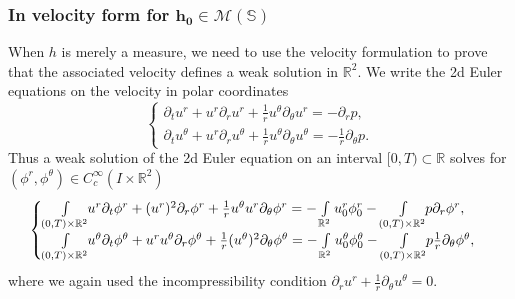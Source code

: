 \documentclass[10pt]{amsart}
\theoremstyle{plain}
\theoremstyle{definition}
\newcommand{\bbR}{\mathbb R}
\begin{document}
\subsubsection{In velocity form for $\boldsymbol{h_0\in \mathcal{M}\left(\mathbb{S}\right)}$}

When $h$ is merely a measure, we need to use the velocity formulation to prove that the associated velocity defines a weak solution in $\bbR^2$. We write the 2d Euler equations on the velocity in polar coordinates
\[
\begin{cases}
\partial_t u^r+u^r\partial_ru^r+\frac{1}{r}u^\theta \partial_\theta u^r=-\partial_r p,\\
\partial_t u^\theta+u^r\partial_ru^\theta+\frac{1}{r}u^\theta \partial_\theta u^\theta=-\frac{1}{r}\partial_\theta p.
\end{cases}
\]
Thus a weak solution of the 2d Euler equation on an interval $[0,T)\subset \mathbb{R}$ solves for $(\phi^r,\phi^\theta)\in C^{\infty}_c\left(I\times \mathbb{R}^2\right)$
\begin{equation}\label{eq: weak euler}
\begin{cases}
\int\limits_{(0,T)\times\mathbb{R}^2}\hspace*{-1mm}u^r \partial_t\phi^r+(u^r)^2 \partial_r \phi^r+\frac{1}{r}u^\theta u^r \partial_\theta \phi^r=-\int\limits_{\mathbb{R}^2}u^r_0\phi^r_0-\int\limits_{(0,T)\times\mathbb{R}^2}\hspace*{-1mm} p \partial_r \phi^r,\\
\int\limits_{(0,T)\times\mathbb{R}^2}\hspace*{-1mm}u^\theta \partial_t\phi^\theta+u^r u^\theta \partial_r \phi^\theta+\frac{1}{r}(u^\theta)^2 \partial_\theta \phi^\theta=-\int\limits_{\mathbb{R}^2}u^\theta_0\phi^\theta_0-\int\limits_{(0,T)\times\mathbb{R}^2}\hspace*{-1mm} p \frac{1}{r}\partial_\theta \phi^\theta,
\end{cases}
\end{equation}
where we again used the incompressibility condition $\partial_r u^r+\frac{1}{r}\partial_\theta u^\theta=0$.
\end{document}
